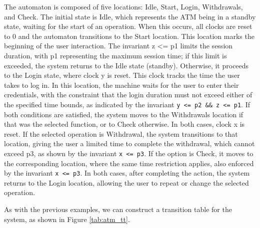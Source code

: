 The automaton is composed of five locations: Idle, Start, Login, Withdrawals, and Check. The initial state is Idle, which represents the ATM being in a standby state, waiting for the start of an operation. When this occurs, all clocks are reset to 0 and the automaton transitions to the Start location. This location marks the beginning of the user interaction. The invariant z <= p1 limits the session duration, with p1 representing the maximum session time; if this limit is exceeded, the system returns to the Idle state (standby). Otherwise, it proceeds to the Login state, where clock y is reset. This clock tracks the time the user takes to log in. In this location, the machine waits for the user to enter their credentials, with the constraint that the login duration must not exceed either of the specified time bounds, as indicated by the invariant \texttt{y <= p2 \&\& z <= p1}. If both conditions are satisfied, the system moves to the Withdrawals location if that was the selected function, or to Check otherwise. In both cases, clock x is reset. If the selected operation is Withdrawal, the system transitions to that location, giving the user a limited time to complete the withdrawal, which cannot exceed p3, as shown by the invariant \texttt{x <= p3}. If the option is Check, it moves to the corresponding location, where the same time restriction applies, also enforced by the invariant \texttt{x <= p3}. In both cases, after completing the action, the system returns to the Login location, allowing the user to repeat or change the selected operation.

As with the previous examples, we can construct a transition table for the system, as shown in Figure \ref{tab:atm_tt}.

